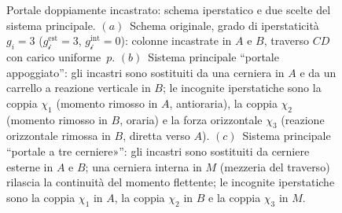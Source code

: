\begin{figure}[htbp]
{\begin{tikzpicture}
				\end{tikzpicture}
			}
			\caption{Portale doppiamente incastrato: schema iperstatico e due scelte
				del sistema principale.
				$(a)$~Schema originale, grado di iperstaticità $g_i = 3$
				($g_{\mathscr{i}}^{\text{est}} = 3$,
				$g_{\mathscr{i}}^{\text{int}} = 0$):
				colonne incastrate in $A$ e $B$, traverso $CD$ con carico
				uniforme~$p$.
				$(b)$~Sistema principale ``portale appoggiato'': gli incastri
				sono sostituiti da una cerniera in $A$ e da un carrello
				a reazione verticale in $B$; le incognite iperstatiche sono
				la coppia $\chi_1$ (momento rimosso in $A$, antioraria),
				la coppia $\chi_2$ (momento rimosso in $B$, oraria)
				e la forza orizzontale $\chi_3$ (reazione orizzontale rimossa
				in $B$, diretta verso $A$).
				$(c)$~Sistema principale ``portale a tre cerniere»'': gli incastri
				sono sostituiti da cerniere esterne in $A$ e $B$; una cerniera
				interna in $M$ (mezzeria del traverso) rilascia la continuità
				del momento flettente; le incognite iperstatiche sono la
				coppia $\chi_1$ in $A$, la coppia $\chi_2$ in $B$
				e la coppia $\chi_3$ in $M$.}
			\label{fig:portale_sistemi_principali}
		\end{figure}
